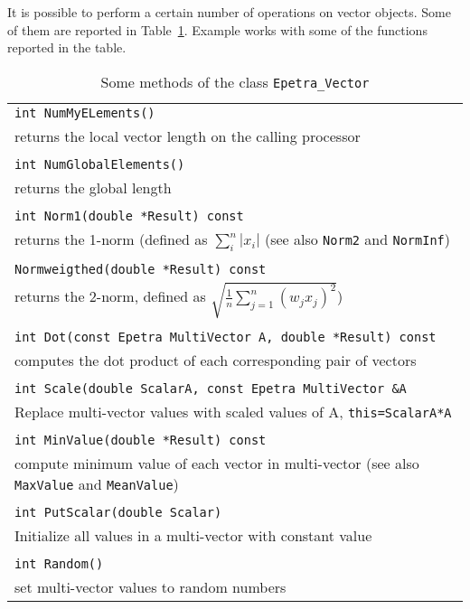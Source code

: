\medskip

It is possible to perform a certain number of operations on vector
objects. Some of them are reported in Table~\ref{tab:distr_vec}.
Example  works with some of the functions reported in
the table.

\begin{table}
\begin{center}
\begin{tabular}{ | p{15cm} | }
\hline
\verb!int NumMyELements()! \\
returns the local vector length on the
calling processor \\
\\
\verb!int NumGlobalElements()! \\
returns the  global length\\
\\
\verb!int Norm1(double *Result) const! \\
returns the 1-norm (defined as $\sum_i^n |
  x_i|$ (see also \verb!Norm2! and \verb!NormInf!)\\
\\
\verb!Normweigthed(double *Result) const! \\
 returns the  2-norm, defined as
$\sqrt{ \frac{1}{n} \sum_{j=1}^{n} (w_j x_j)^2}$) \\
\\
\verb!int Dot(const Epetra MultiVector A, double *Result) const! \\
 computes
the dot product of each corresponding pair of vectors \\
\\
\verb!int Scale(double ScalarA, const Epetra MultiVector &A! \\
Replace multi-vector values with scaled values of A,
\verb!this=ScalarA*A! \\
\\
\verb!int MinValue(double *Result) const! \\
compute minimum value of
each vector in multi-vector (see also \verb!MaxValue! and \verb!MeanValue!)\\
\\
\verb!int PutScalar(double Scalar)! \\
Initialize all values in a
multi-vector with constant value \\
\\
\verb!int Random()! \\
 set multi-vector values to random numbers \\
\hline
\end{tabular}
\caption{Some methods of the class {\tt Epetra\_Vector}}
\label{tab:distr_vec}
\end{center}
\end{table}

